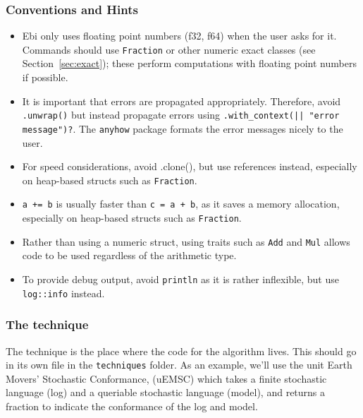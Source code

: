 \documentclass{article}
\begin{document}
		\subsubsection{Conventions and Hints}
			\begin{itemize}
				\item Ebi only uses floating point numbers (f32, f64) when the user asks for it.
				Commands should use \verb=Fraction= or other numeric exact classes (see Section~\ref{sec:exact}); these perform computations with floating point numbers if possible.
				\item It is important that errors are propagated appropriately.
				Therefore, avoid \verb=.unwrap()= but instead propagate errors using \verb=.with_context(|| "error message")?=.
				The \verb=anyhow= package formats the error messages nicely to the user.
				\item For speed considerations, avoid .clone(), but use references instead, especially on heap-based structs such as \verb=Fraction=.
				\item \verb|a += b| is usually faster than \verb|c = a + b|, as it saves a memory allocation, especially on heap-based structs such as \verb=Fraction=.
				\item Rather than using a numeric struct, using traits such as \verb=Add= and \verb=Mul= allows code to be used regardless of the arithmetic type.
				\item To provide debug output, avoid \verb=println= as it is rather inflexible, but use \verb=log::info= instead.
			\end{itemize}
		
		\subsubsection{The technique}
			The technique is the place where the code for the algorithm lives.
			This should go in its own file in the \verb=techniques= folder.
			As an example, we'll use the unit Earth Movers' Stochastic Conformance, (uEMSC) which takes a finite stochastic language (log) and a queriable stochastic language (model), and returns a fraction to indicate the conformance of the log and model.
			
\end{document}
